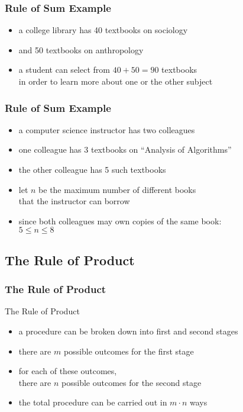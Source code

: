 \documentclass[dvipsnames]{beamer}
\begin{document}
\begin{frame}
  \frametitle{Rule of Sum Example}

  \begin{example}
    \begin{itemize}
      \item a college library has 40 textbooks on sociology
      \item and 50 textbooks on anthropology

      \medskip
      \item a student can select from $40 + 50 = 90$ textbooks\\
        in order to learn more about one or the other subject
    \end{itemize}
  \end{example}
\end{frame}

\begin{frame}
  \frametitle{Rule of Sum Example}

  \begin{example}
    \begin{itemize}
      \item a computer science instructor has two colleagues
      \item one colleague has 3 textbooks on ``Analysis of Algorithms''
      \item the other colleague has 5 such textbooks

      \medskip
      \item let $n$ be the maximum number of different books\\
        that the instructor can borrow
      \item since both colleagues may own copies of the same book:\\
        $5 \leq n \leq 8$
   \end{itemize}
  \end{example}
\end{frame}

\subsection{The Rule of Product}

\begin{frame}
  \frametitle{The Rule of Product}

  \begin{block}{The Rule of Product}
    \begin{itemize}
      \item a procedure can be broken down into first and second stages
      \item there are $m$ possible outcomes for the first stage
      \item for each of these outcomes,\\
        there are $n$ possible outcomes for the second stage

      \pause
      \medskip
      \item the total procedure can be carried out in $m \cdot n$ ways
    \end{itemize}
  \end{block}
\end{frame}
\end{document}
